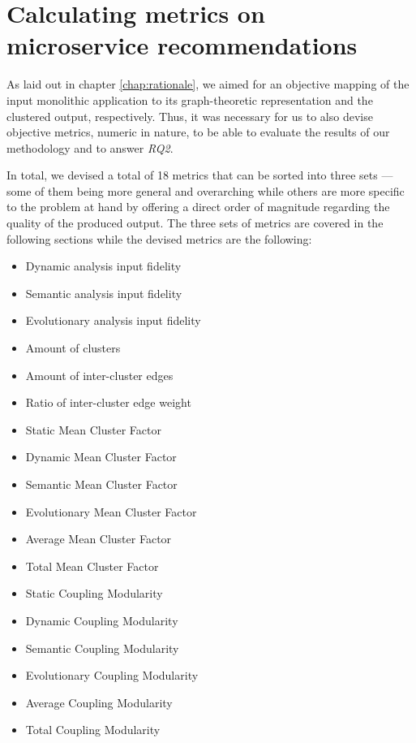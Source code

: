 \documentclass[12pt,a4paper]{report}
\begin{document}
\chapter{Calculating metrics on microservice recommendations} \label{chap:metrics}

As laid out in chapter \ref{chap:rationale}, we aimed for an objective mapping
of the input monolithic application to its graph-theoretic representation and
the clustered output, respectively. Thus, it was necessary for us to also
devise objective metrics, numeric in nature, to be able to evaluate the results
of our methodology and to answer \textit{RQ2}.

In total, we devised a total of 18 metrics that can be sorted into three
sets --- some of them being more general and overarching while others are more
specific to the problem at hand by offering a direct order of magnitude
regarding the quality of the produced output. The three sets of metrics are
covered in the following sections while the devised metrics are the following:
\begin{itemize}
  \item Dynamic analysis input fidelity
  \item Semantic analysis input fidelity
  \item Evolutionary analysis input fidelity
  \item Amount of clusters
  \item Amount of inter-cluster edges
  \item Ratio of inter-cluster edge weight
  \item Static Mean Cluster Factor
  \item Dynamic Mean Cluster Factor
  \item Semantic Mean Cluster Factor
  \item Evolutionary Mean Cluster Factor
  \item Average Mean Cluster Factor
  \item Total Mean Cluster Factor
  \item Static Coupling Modularity
  \item Dynamic Coupling Modularity
  \item Semantic Coupling Modularity
  \item Evolutionary Coupling Modularity
  \item Average Coupling Modularity
  \item Total Coupling Modularity
\end{itemize}
\end{document}
